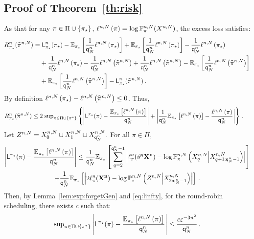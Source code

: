 \subsection{Proof of Theorem~\ref{th:risk}}
\label{sec:proofs:risk}
As that for any $\pi\in\Pi\cup\{\pi_{\star}\}$, $\ell^{n,N}\left(\pi\right) = \log \mathbb{P}^{n,N}_{\pi}(X^{n,N})$, the excess loss satisfies:
\begin{align*}
R^{n}_{\bayes}(\MLE^{n,N}) =&\;\kullback^n_{\bayes}(\bayes)-\E_{\bayes}\left[\frac{1}{\ordermax{n}{N}}\Lo{n,N}{\bayes}\right]+\E_{\bayes}\left[\frac{1}{\ordermax{n}{N}}\Lo{n,N}{\bayes}\right]-\frac{1}{\ordermax{n}{N}}\Lo{n,N}{\bayes}\\
&+\frac{1}{\ordermax{n}{N}}\Lo{n,N}{\bayes}-\frac{1}{\ordermax{n}{N}}\Lo{n,N}{\MLE^{n,N}}+\frac{1}{\ordermax{n}{N}}\Lo{n,N}{\MLE^{n,N}}-\E_{\bayes}\left[\frac{1}{\ordermax{n}{N}}\Lo{n,N}{\MLE^{n,N}}\right]\\
&+\E_{\bayes}\left[\frac{1}{\ordermax{n}{N}}\Lo{n,N}{\MLE^{n,N}}\right]-\kullback^n_{\bayes}(\MLE^{n,N})\eqsp.
\end{align*}
By definition $\ell^{n,N}\left(\pi_{\star}\right)-\ell^{n,N}\left(\widehat{\pi}^{n,N}\right)\le 0$. Thus,
\begin{align*}
R^{n}_{\bayes}(\MLE^{n,N}) 
&\le 2\;\sup_{\pi\in\Pi\cup\{\pi^*\}}\set{\left|\kullback^{\bayes}(\pi)-\frac{\E_{\bayes}\left[\Lo{n,N}{\pi}\right]}{\ordermax{n}{N}}\right|
+\left|\frac{1}{\ordermax{n}{N}}\E_{\bayes}\left[\Lo{n,N}{\pi}\right]-\frac{\Lo{n,N}{\pi}}{\ordermax{n}{N}}\right|}\eqsp.
\end{align*}
Let $Z^{n,N} = X_{0}^{n,N}\cup X_{1}^{n,N}\cup X_{{\mathsf{q}}^{n}_{N}}^{n,N}$. For all $\pi\in\Pi$,
\begin{multline*}
\left|\kullback^{\bayes}(\pi)-\frac{\E_{\bayes}\left[\Lo{n,N}{\pi}\right]}{\ordermax{n}{N}}\right| \le \frac{1}{\ordermax{n}{N}} \E_{\bayes}\left[\sum_{q=2}^{\ordermax{n}{N}-1}\left|\ell_{\pi}^{n}(\shift^q{\bf X^{n}})- \log \likelihood{n,N}{\pi}\left( X_{q}^{n,N}\middle| X_{q+1:\ordermax{n}{N}-1}^{n,N}\right)\right|\right]\\
+ \frac{1}{\ordermax{n}{N}} \E_{\bayes}\left[\left|2\ell_{\pi}^{n}({\bf X^{n}})- \log \likelihood{n,N}{\pi}\left(Z^{n,N}\middle|X_{2:\ordermax{n}{N}-1}^{n,N}\right)\right|\right]\eqsp.
\end{multline*}
Then, by Lemma~\ref{lem:exp:forgetGen} and \eqref{eq:linfty}, for the round-robin scheduling, there exists $c$ such that:
\[
\mathrm{sup}_{\pi\in\Pi\cup\{\pi^*\}}\left|\mathsf{L}^{\pi_{\star}}(\pi)-\frac{\mathbb{E}_{\pi_{\star}}\left[\ell^{n,N}\left(\pi\right)\right]}{{\mathsf{q}}^{n}_{N}}\right|\le \frac{c\varepsilon^{-3n^2}}{{\mathsf{q}}^{n}_{N}}\,.
\]
